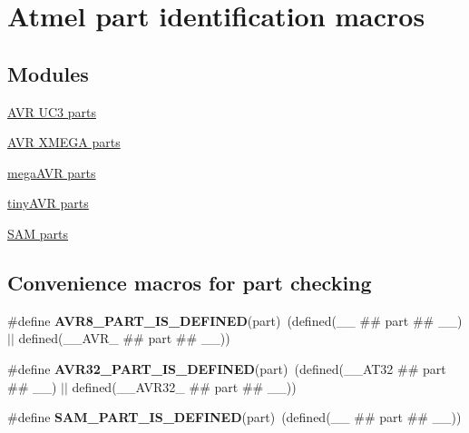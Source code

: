 \hypertarget{group__part__macros__group}{\section{Atmel part identification macros}
\label{group__part__macros__group}
}
\subsection*{Modules}
\begin{DoxyCompactItemize}
\item 
\hyperlink{group__uc3__part__macros__group}{A\-V\-R U\-C3 parts}
\item 
\hyperlink{group__xmega__part__macros__group}{A\-V\-R X\-M\-E\-G\-A parts}
\item 
\hyperlink{group__mega__part__macros__group}{mega\-A\-V\-R parts}
\item 
\hyperlink{group__tiny__part__macros__group}{tiny\-A\-V\-R parts}
\item 
\hyperlink{group__sam__part__macros__group}{S\-A\-M parts}
\end{DoxyCompactItemize}
\subsection*{Convenience macros for part checking}
\begin{DoxyCompactItemize}
\item 
\hypertarget{group__part__macros__group_ga2fb54ec8ba6d98af5ed21dfb4ec97483}{\#define {\bfseries A\-V\-R8\-\_\-\-P\-A\-R\-T\-\_\-\-I\-S\-\_\-\-D\-E\-F\-I\-N\-E\-D}(part)~(defined(\-\_\-\-\_\- \#\# part \#\# \-\_\-\-\_\-) $|$$|$ defined(\-\_\-\-\_\-\-A\-V\-R\-\_\- \#\# part \#\# \-\_\-\-\_\-))}\label{group__part__macros__group_ga2fb54ec8ba6d98af5ed21dfb4ec97483}

\item 
\hypertarget{group__part__macros__group_gac253d1a424ff2bc355184e3cdb93514d}{\#define {\bfseries A\-V\-R32\-\_\-\-P\-A\-R\-T\-\_\-\-I\-S\-\_\-\-D\-E\-F\-I\-N\-E\-D}(part)~(defined(\-\_\-\-\_\-\-A\-T32 \#\# part \#\# \-\_\-\-\_\-) $|$$|$ defined(\-\_\-\-\_\-\-A\-V\-R32\-\_\- \#\# part \#\# \-\_\-\-\_\-))}\label{group__part__macros__group_gac253d1a424ff2bc355184e3cdb93514d}

\item 
\hypertarget{group__part__macros__group_ga50580478fd56bb842e0cbdd354a6933c}{\#define {\bfseries S\-A\-M\-\_\-\-P\-A\-R\-T\-\_\-\-I\-S\-\_\-\-D\-E\-F\-I\-N\-E\-D}(part)~(defined(\-\_\-\-\_\- \#\# part \#\# \-\_\-\-\_\-))}\label{group__part__macros__group_ga50580478fd56bb842e0cbdd354a6933c}

\end{DoxyCompactItemize}



